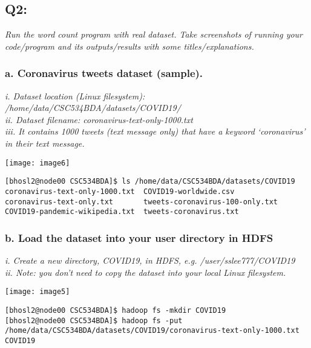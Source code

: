 \documentclass[]{article}
\begin{document}
\clearpage

\subsection*{Q2:}
\emph{Run the word count program with real dataset. Take screenshots of running your 
	code/program and its outputs/results with some titles/explanations. }

\subsubsection*{a. Coronavirus tweets dataset (sample).}
\emph{ i. Dataset location (Linux filesystem): \\
	/home/data/CSC534BDA/datasets/COVID19/ \\
	ii. Dataset filename: coronavirus-text-only-1000.txt \\
	iii. It contains 1000 tweets (text message only) that have a keyword 
	‘coronavirus’ in their text message. }

\texttt{[image: image6]} \vspace{-1em}
\begin{verbatim}
[bhosl2@node00 CSC534BDA]$ ls /home/data/CSC534BDA/datasets/COVID19
coronavirus-text-only-1000.txt  COVID19-worldwide.csv
coronavirus-text-only.txt       tweets-coronavirus-100-only.txt
COVID19-pandemic-wikipedia.txt  tweets-coronavirus.txt
\end{verbatim}

\subsubsection*{b. Load the dataset into your user directory in HDFS}
\emph{i. Create a new directory, COVID19, in HDFS, 
	e.g. /user/sslee777/COVID19	\\
	ii. Note: you don’t need to copy the dataset into your local Linux filesystem.}

\texttt{[image: image5]} \vspace{-1em}
\begin{verbatim}
[bhosl2@node00 CSC534BDA]$ hadoop fs -mkdir COVID19
[bhosl2@node00 CSC534BDA]$ hadoop fs -put /home/data/CSC534BDA/datasets/COVID19/coronavirus-text-only-1000.txt COVID19
\end{verbatim}

\clearpage
\end{document}
